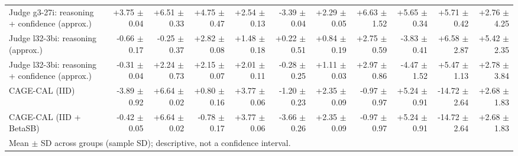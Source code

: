 \begin{tabular}{lrrrrrrrrrr}
Judge g3-27i: reasoning + confidence (approx.) & +3.75 {\scriptsize $\pm$ 0.04} & +6.51 {\scriptsize $\pm$ 0.33} & +4.75 {\scriptsize $\pm$ 0.47} & +2.54 {\scriptsize $\pm$ 0.13} & -3.39 {\scriptsize $\pm$ 0.04} & +2.29 {\scriptsize $\pm$ 0.05} & +6.63 {\scriptsize $\pm$ 1.52} & +5.65 {\scriptsize $\pm$ 0.34} & +5.71 {\scriptsize $\pm$ 0.42} & +2.76 {\scriptsize $\pm$ 4.25} \\
Judge l32-3bi: reasoning (approx.) & -0.66 {\scriptsize $\pm$ 0.17} & -0.25 {\scriptsize $\pm$ 0.37} & +2.82 {\scriptsize $\pm$ 0.08} & +1.48 {\scriptsize $\pm$ 0.18} & +0.22 {\scriptsize $\pm$ 0.51} & +0.84 {\scriptsize $\pm$ 0.19} & +2.75 {\scriptsize $\pm$ 0.59} & -3.83 {\scriptsize $\pm$ 0.41} & +6.58 {\scriptsize $\pm$ 2.87} & +5.42 {\scriptsize $\pm$ 2.35} \\
Judge l32-3bi: reasoning + confidence (approx.) & -0.31 {\scriptsize $\pm$ 0.04} & +2.24 {\scriptsize $\pm$ 0.73} & +2.15 {\scriptsize $\pm$ 0.07} & +2.01 {\scriptsize $\pm$ 0.11} & -0.28 {\scriptsize $\pm$ 0.25} & +1.11 {\scriptsize $\pm$ 0.03} & +2.97 {\scriptsize $\pm$ 0.86} & -4.47 {\scriptsize $\pm$ 1.52} & +5.47 {\scriptsize $\pm$ 1.13} & +2.78 {\scriptsize $\pm$ 3.84} \\
CAGE-CAL (IID) & -3.89 {\scriptsize $\pm$ 0.92} & +6.64 {\scriptsize $\pm$ 0.02} & +0.80 {\scriptsize $\pm$ 0.16} & +3.77 {\scriptsize $\pm$ 0.06} & -1.20 {\scriptsize $\pm$ 0.23} & +2.35 {\scriptsize $\pm$ 0.09} & -0.97 {\scriptsize $\pm$ 0.97} & +5.24 {\scriptsize $\pm$ 0.91} & -14.72 {\scriptsize $\pm$ 2.64} & +2.68 {\scriptsize $\pm$ 1.83} \\
CAGE-CAL (IID + BetaSB) & -0.42 {\scriptsize $\pm$ 0.05} & +6.64 {\scriptsize $\pm$ 0.02} & -0.78 {\scriptsize $\pm$ 0.17} & +3.77 {\scriptsize $\pm$ 0.06} & -3.66 {\scriptsize $\pm$ 0.26} & +2.35 {\scriptsize $\pm$ 0.09} & -0.97 {\scriptsize $\pm$ 0.97} & +5.24 {\scriptsize $\pm$ 0.91} & -14.72 {\scriptsize $\pm$ 2.64} & +2.68 {\scriptsize $\pm$ 1.83} \\
\bottomrule
\multicolumn{11}{l}{\scriptsize Mean $\pm$ SD across groups (sample SD); descriptive, not a confidence interval.} \\
\end{tabular}
